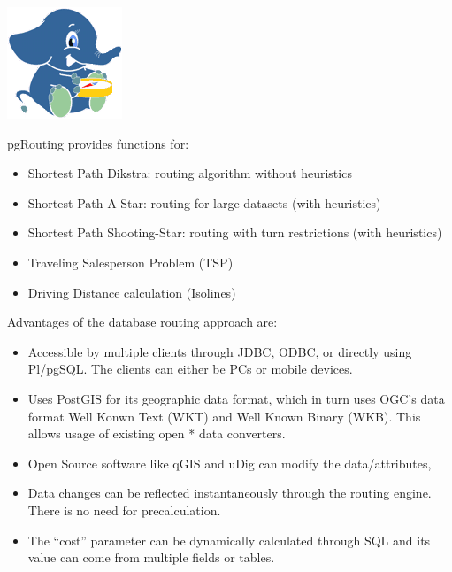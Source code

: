 \documentclass[a4paper,10pt,english]{manual}
\begin{document}
\includegraphics{pgrouting.png}

pgRouting provides functions for:
\begin{itemize}
\item {} 
Shortest Path Dikstra: routing algorithm without heuristics

\item {} 
Shortest Path A-Star: routing for large datasets (with heuristics)

\item {} 
Shortest Path Shooting-Star: routing with turn restrictions (with heuristics)

\item {} 
Traveling Salesperson Problem (TSP)

\item {} 
Driving Distance calculation (Isolines)

\end{itemize}

Advantages of the database routing approach are:
\begin{itemize}
\item {} 
Accessible by multiple clients through JDBC, ODBC, or directly using Pl/pgSQL. The clients can either be PCs or mobile devices.

\item {} 
Uses PostGIS for its geographic data format, which in turn uses OGC's data format Well Konwn Text (WKT) and Well Known Binary (WKB). This allows usage of existing open * data converters.

\item {} 
Open Source software like qGIS and uDig can modify the data/attributes,

\item {} 
Data changes can be reflected instantaneously through the routing engine. There is no need for precalculation.

\item {} 
The ``cost'' parameter can be dynamically calculated through SQL and its value can come from multiple fields or tables.

\end{itemize}
\end{document}
